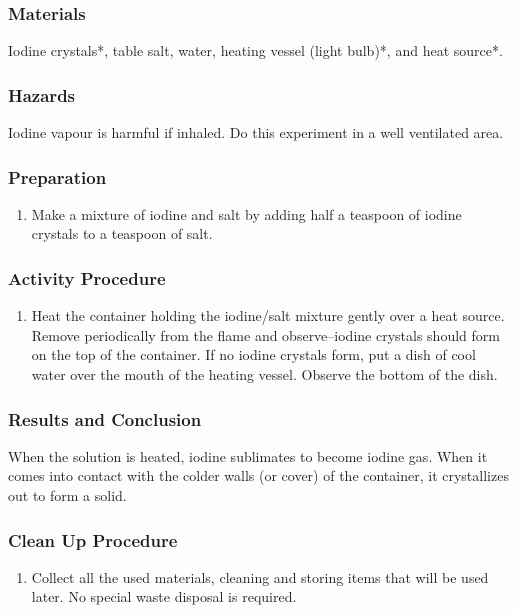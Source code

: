 \subsubsection*{Materials}
Iodine crystals*, table salt, water, heating vessel (light bulb)*, and heat source*.
\subsubsection*{Hazards}
Iodine vapour is harmful if inhaled. Do this experiment in a well ventilated area.
\subsubsection*{Preparation}
\begin{enumerate}
\item{Make a mixture of iodine and salt by adding half a teaspoon of iodine crystals to a teaspoon of salt.}
\end{enumerate}

\subsubsection*{Activity Procedure}
\begin{enumerate}
\item{Heat the container holding the iodine/salt mixture gently over a heat source. Remove periodically from the flame and observe--iodine crystals should form on the top of the container. If no iodine crystals form, put a dish of cool water over the mouth of the heating vessel. Observe the bottom of the dish. }
\end{enumerate}

\subsubsection*{Results and Conclusion}
When the solution is heated, iodine sublimates to become iodine gas. When it comes into contact with the colder walls (or cover) of the container, it crystallizes out to form a solid.

\subsubsection*{Clean Up Procedure}
\begin{enumerate}
\item{Collect all the used materials, cleaning and storing items that will be used later. No special waste disposal is required.}
\end{enumerate}

